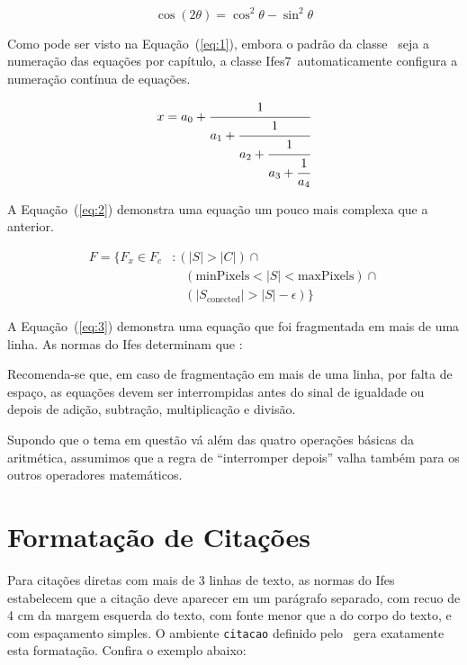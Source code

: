 \documentclass[times,english,brazil,oneside]{ifes7}
\newcommand{\ifestex}{\textsf{Ifes$7$}}
\begin{document}
\begin{equation}
  \label{eq:1}
  \cos (2\theta) = \cos^2 \theta - \sin^2 \theta
\end{equation}

Como pode ser visto na Equação~(\ref{eq:1}), embora o padrão da classe
\abnTeX\ seja a numeração das equações por capítulo, a classe
\ifestex\ automaticamente configura a numeração contínua de equações.

\begin{equation}
  \label{eq:2}
  x = a_0 + \cfrac{1}{a_1 
    + \cfrac{1}{a_2 
      + \cfrac{1}{a_3 + \cfrac{1}{a_4}}}}
\end{equation}

A Equação~(\ref{eq:2}) demonstra uma equação um pouco mais complexa
que a anterior.

\begin{equation}
  \label{eq:3}
  \begin{split}
    F = \{F_{x} \in  F_{c} &: (|S| > |C|) \cap {}\\
    &\quad (\text{minPixels}  < |S| < \text{maxPixels}) \cap {} \\
    &\quad (|S_{\text{conected}}| > |S| - \epsilon) \}
  \end{split}
\end{equation}

A Equação~(\ref{eq:3}) demonstra uma equação que foi fragmentada em
mais de uma linha. As normas do Ifes determinam que
\cite[p.~38]{Ifes2014}:

\begin{citacao}
  Recomenda-se que, em caso de fragmentação em mais de uma linha, por
  falta de espaço, as equações devem ser interrompidas antes do sinal
  de igualdade ou depois de adição, subtração, multiplicação e
  divisão.
\end{citacao}

Supondo que o tema em questão vá além das quatro operações básicas da
aritmética, assumimos que a regra de ``interromper depois'' valha
também para os outros operadores matemáticos.


\section{Formatação de Citações}
\label{sec:format-citac}

Para citações diretas com mais de 3 linhas de texto, as normas do Ifes
estabelecem que a citação deve aparecer em um parágrafo separado, com
recuo de 4 cm da margem esquerda do texto, com fonte menor que a do
corpo do texto, e com espaçamento simples. O ambiente \texttt{citacao}
definido pelo \abnTeX\ gera exatamente esta formatação. Confira o
exemplo abaixo:
\end{document}
